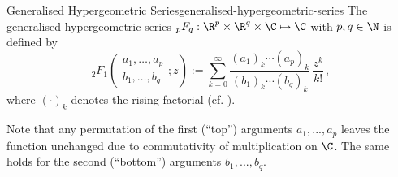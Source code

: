 \begin{definition}{Generalised Hypergeometric Series}{generalised-hypergeometric-series}
  The generalised hypergeometric series ${}_pF_q: \R^p \times \R^q \times \C \mapsto \C$ with $p, q \in \N$ is defined by
  $${}_2F_1\left(\begin{matrix}a_{1}, \ldots, a_{p} \\b_{1}, \ldots, b_{q}\end{matrix}; z\right) := \sum _{k=0}^{\infty }{\frac {(a_{1})_{k}\cdots (a_{p})_{k}}{(b_{1})_{k}\cdots (b_{q})_{k}}}\,{\frac {z^{k}}{k!}}\,,$$
  where $(\cdot)_k$ denotes the rising factorial (cf. ).
\end{definition}

Note that any permutation of the first (``top'') arguments $a_1, ..., a_p$ leaves the function unchanged due to commutativity of multiplication on $\C$. The same holds for the second (``bottom'') arguments $b_1, ..., b_q$.
